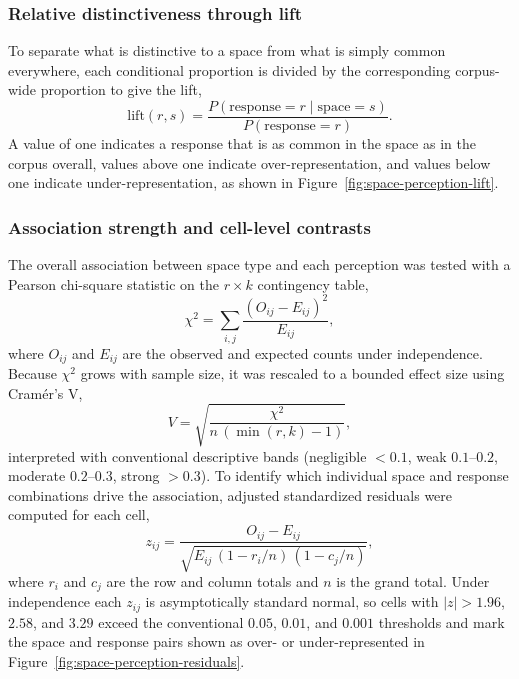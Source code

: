 \documentclass[]{interact}
\begin{document}
\subsubsection{Relative distinctiveness through lift}\label{sec:methods-lift}
To separate what is distinctive to a space from what is simply common everywhere, each conditional proportion is divided by the corresponding corpus-wide proportion to give the lift,
\begin{equation}
\mathrm{lift}(r,s) = \frac{P(\mathrm{response}=r \mid \mathrm{space}=s)}{P(\mathrm{response}=r)}.
\end{equation}
A value of one indicates a response that is as common in the space as in the corpus overall, values above one indicate over-representation, and values below one indicate under-representation, as shown in Figure~\ref{fig:space-perception-lift}.

\subsubsection{Association strength and cell-level contrasts}\label{sec:methods-association}
The overall association between space type and each perception was tested with a Pearson chi-square statistic on the $r \times k$ contingency table,
\begin{equation}
\chi^{2} = \sum_{i,j} \frac{(O_{ij}-E_{ij})^{2}}{E_{ij}},
\end{equation}
where $O_{ij}$ and $E_{ij}$ are the observed and expected counts under independence.
Because $\chi^{2}$ grows with sample size, it was rescaled to a bounded effect size using Cram\'er's V,
\begin{equation}
V = \sqrt{\frac{\chi^{2}}{n\,(\min(r,k)-1)}},
\end{equation}
interpreted with conventional descriptive bands (negligible $<0.1$, weak $0.1$--$0.2$, moderate $0.2$--$0.3$, strong $>0.3$).
To identify which individual space and response combinations drive the association, adjusted standardized residuals were computed for each cell,
\begin{equation}
z_{ij} = \frac{O_{ij}-E_{ij}}{\sqrt{E_{ij}\,(1-r_{i}/n)\,(1-c_{j}/n)}},
\end{equation}
where $r_{i}$ and $c_{j}$ are the row and column totals and $n$ is the grand total.
Under independence each $z_{ij}$ is asymptotically standard normal, so cells with $|z|>1.96$, $2.58$, and $3.29$ exceed the conventional $0.05$, $0.01$, and $0.001$ thresholds and mark the space and response pairs shown as over- or under-represented in Figure~\ref{fig:space-perception-residuals}.
\end{document}
